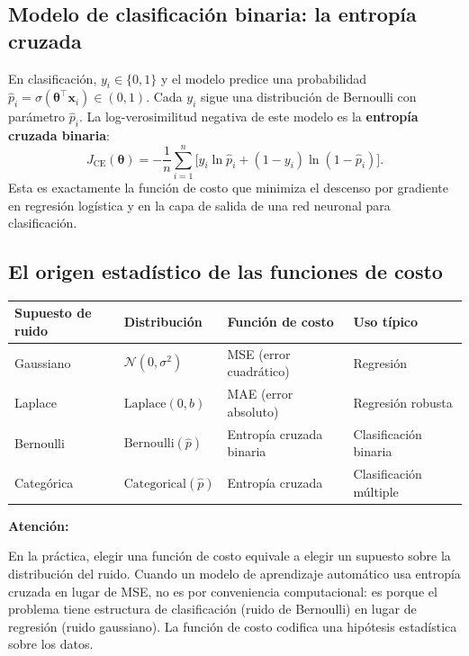 \documentclass[12pt, a4paper]{article}
\newenvironment{vizadv}{%
    \begin{mdframed}[style=viznaranja]
    \textbf{\color{bordeadv}Atención:}\quad
}{%
    \end{mdframed}
}
\newcommand{\T}{{\top}}
\newcommand{\btheta}{\boldsymbol{\theta}}
\begin{document}
\subsection{Modelo de clasificación binaria: la entropía cruzada}

En clasificación, $y_i \in \{0, 1\}$ y el modelo predice una
probabilidad $\hat{p}_i = \sigma(\btheta^\T \mathbf{x}_i) \in (0,1)$.
Cada $y_i$ sigue una distribución de Bernoulli con parámetro $\hat{p}_i$.
La log-verosimilitud negativa de este modelo es la
\textbf{entropía cruzada binaria}:
\[
    J_{\text{CE}}(\btheta) = -\frac{1}{n}\sum_{i=1}^{n}
    \bigl[y_i \ln \hat{p}_i + (1 - y_i)\ln(1 - \hat{p}_i)\bigr].
\]
Esta es exactamente la función de costo que minimiza el descenso por
gradiente en regresión logística y en la capa de salida de una red
neuronal para clasificación.

\subsection{El origen estadístico de las funciones de costo}

\begin{center}
\small
\begin{tabular}{llll}
    \toprule
    \textbf{Supuesto de ruido} & \textbf{Distribución} &
    \textbf{Función de costo} & \textbf{Uso típico} \\
    \midrule
    Gaussiano   & $\mathcal{N}(0,\sigma^2)$   & MSE (error cuadrático)  & Regresión \\
    Laplace     & $\text{Laplace}(0,b)$       & MAE (error absoluto)    & Regresión robusta \\
    Bernoulli   & $\text{Bernoulli}(\hat{p})$ & Entropía cruzada binaria & Clasificación binaria \\
    Categórica  & $\text{Categorical}(\hat{p})$ & Entropía cruzada       & Clasificación múltiple \\
    \bottomrule
\end{tabular}
\end{center}

\begin{vizadv}
En la práctica, elegir una función de costo equivale a elegir un
supuesto sobre la distribución del ruido. Cuando un modelo de
aprendizaje automático usa entropía cruzada en lugar de MSE, no es
por conveniencia computacional: es porque el problema tiene estructura
de clasificación (ruido de Bernoulli) en lugar de regresión (ruido
gaussiano). La función de costo codifica una hipótesis estadística
sobre los datos.
\end{vizadv}
\end{document}
